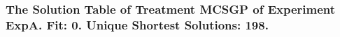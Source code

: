  \begin{frame}
 \fontsize{8pt}{9pt}\selectfont
 \frametitle{ The Solution Table of Treatment MCSGP of Experiment ExpA. Fit: 0. Unique Shortest Solutions: 198. }

 \label{ExpASolutionTable001.tex}  
 \end{frame}

